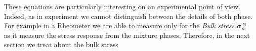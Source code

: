 These equations are particularly interesting on an experimental point of view. 
Indeed, as in experiment we cannot distinguish between the details of both phase. 
For example in a Rheometer we are able to measure only for the \textit{Bulk stress} $\bm\sigma^\text{eq}_m$ as it measure the stress response from the mixture phases. 
Therefore, in the next section we treat about the bulk stress